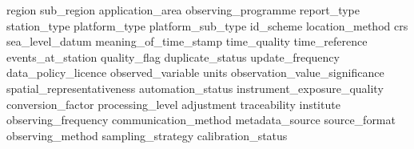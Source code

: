 \documentclass[a4paper]{article}
\begin{document}
 {region}
 {sub_region}
 {application_area}
 {observing_programme}
 {report_type}
 {station_type}
 {platform_type}
 {platform_sub_type}
 {id_scheme}
 {location_method}
 {crs}
 {sea_level_datum}
 {meaning_of_time_stamp}
 {time_quality}
 {time_reference}
 {events_at_station}
 {quality_flag}
 {duplicate_status}
 {update_frequency}
 {data_policy_licence}
 {observed_variable}
 {units}
 {observation_value_significance}
 {spatial_representativeness}
 {automation_status}
 {instrument_exposure_quality}
 {conversion_factor}
 {processing_level}
 {adjustment}
 {traceability}
 {institute}
 {observing_frequency}
 {communication_method}
 {metadata_source}
 {source_format}
 {observing_method}
 {sampling_strategy}
 {calibration_status}
\end{document}
